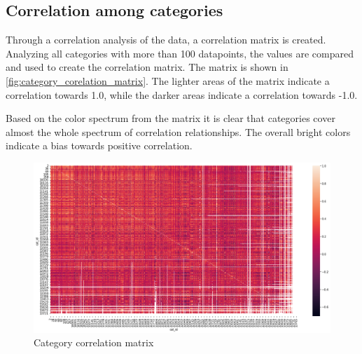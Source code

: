 \subsection{Correlation among categories}
Through a correlation analysis of the data, a correlation matrix is created.
Analyzing all categories with more than 100 datapoints, the values are compared and used to create the correlation matrix.
The matrix is shown in \autoref{fig:category_corelation_matrix}.
The lighter areas of the matrix indicate a correlation towards 1.0, while the darker areas indicate a correlation towards -1.0.

Based on the color spectrum from the matrix it is clear that categories cover almost the whole spectrum of correlation relationships.
The overall bright colors indicate a bias towards positive correlation.

  \begin{figure}[h!]
      \centering
      \includegraphics[width=\textwidth]{./figs/code_generated/data_exploration/category_correlation_matrix.png}
      \hfill
      \caption{Category correlation matrix}
      \label{fig:category_corelation_matrix}
  \end{figure}





